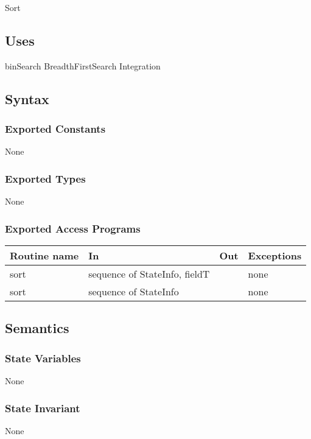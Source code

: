 \documentclass[12pt]{article}
\begin{document}
Sort

\subsection* {Uses}

binSearch
BreadthFirstSearch
Integration

\subsection* {Syntax}

\subsubsection* {Exported Constants}

None

\subsubsection* {Exported Types}

None

\subsubsection* {Exported Access Programs}

\begin{tabular}{| l | l | l | p{5cm} |}
\hline
\textbf{Routine name} & \textbf{In} & \textbf{Out} & \textbf{Exceptions}\\
\hline
sort & sequence of StateInfo, fieldT &  & none\\
\hline
sort &  sequence of StateInfo & & none\\
\hline
\end{tabular}

\subsection* {Semantics}

\subsubsection* {State Variables}
None

\subsubsection* {State Invariant}

None
\end{document}
